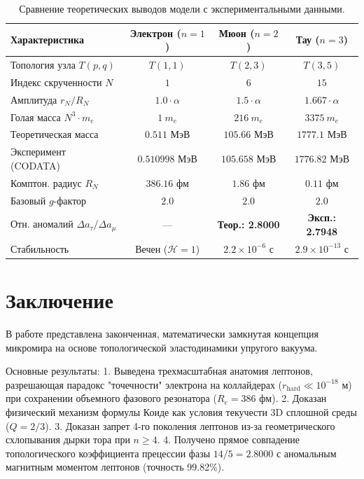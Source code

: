 \documentclass[12pt,a4paper]{article}
\begin{document}
			\begin{table}[h!]
				\centering
				\caption{Сравнение теоретических выводов модели с экспериментальными данными.}
				\label{tab:results}
				\begin{tabular}{l c c c}
					\toprule
					\textbf{Характеристика} & \textbf{Электрон ($n=1$)} & \textbf{Мюон ($n=2$)} & \textbf{Тау ($n=3$)} \\
					\midrule
					Топология узла $T(p,q)$ & $T(1,1)$ & $T(2,3)$ & $T(3,5)$ \\
					Индекс скрученности $N$ & $1$ & $6$ & $15$ \\
					Амплитуда $r_N / R_N$ & $1.0 \cdot \alpha$ & $1.5 \cdot \alpha$ & $1.667 \cdot \alpha$ \\
					Голая масса $N^3 \cdot m_e$ & $1 \ m_e$ & $216 \ m_e$ & $3375 \ m_e$ \\
					Теоретическая масса & $0.511 \text{ МэВ}$ & $105.66 \text{ МэВ}$ & $1777.1 \text{ МэВ}$ \\
					Эксперимент (CODATA) & $0.510998 \text{ МэВ}$ & $105.658 \text{ МэВ}$ & $1776.82 \text{ МэВ}$ \\
					Комптон. радиус $R_N$ & $386.16 \text{ фм}$ & $1.86 \text{ фм}$ & $0.11 \text{ фм}$ \\
					Базовый $g$-фактор & $2.0$ & $2.0$ & $2.0$ \\
					Отн. аномалий $\Delta a_\tau / \Delta a_\mu$ & — & \textbf{Теор.: 2.8000} & \textbf{Эксп.: 2.7948} \\
					Стабильность & Вечен ($\mathcal{H}=1$) & $2.2 \times 10^{-6} \text{ с}$ & $2.9 \times 10^{-13} \text{ с}$ \\
					\bottomrule
				\end{tabular}
			\end{table}
			
			\section{Заключение}
			В работе представлена законченная, математически замкнутая концепция микромира на основе топологической эластодинамики упругого вакуума. 
			
			Основные результаты:
			1. Выведена трехмасштабная анатомия лептонов, разрешающая парадокс "точечности" электрона на коллайдерах ($r_{\text{hard}} \ll 10^{-18} \text{ м}$) при сохранении объемного фазового резонатора ($R_e = 386 \text{ фм}$).
			2. Доказан физический механизм формулы Коиде как условия текучести 3D сплошной среды ($Q = 2/3$).
			3. Доказан запрет 4-го поколения лептонов из-за геометрического схлопывания дырки тора при $n \ge 4$.
			4. Получено прямое совпадение топологического коэффициента прецессии фазы $14/5 = 2.8000$ с аномальным магнитным моментом лептонов (точность 99.82\%).
			
\end{document}

